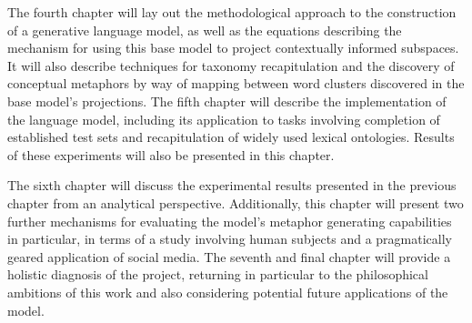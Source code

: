 The fourth chapter will lay out the methodological approach to the construction of a generative language model, as well as the equations describing the mechanism for using this base model to project contextually informed subspaces.  It will also describe techniques for taxonomy recapitulation and the discovery of conceptual metaphors by way of mapping between word clusters discovered in the base model's projections.  The fifth chapter will describe the implementation of the language model, including its application to tasks involving completion of established test sets and recapitulation of widely used lexical ontologies.  Results of these experiments will also be presented in this chapter.

The sixth chapter will discuss the experimental results presented in the previous chapter from an analytical perspective.  Additionally, this chapter will present two further mechanisms for evaluating the model's metaphor generating capabilities in particular, in terms of a study involving human subjects and a pragmatically geared application of social media.  The seventh and final chapter will provide a holistic diagnosis of the project, returning in particular to the philosophical ambitions of this work and also considering potential future applications of the model.
